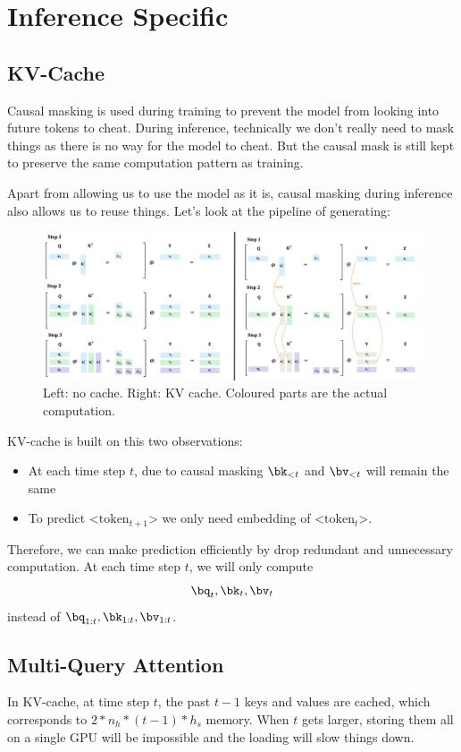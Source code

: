 \documentclass{article}
\begin{document}
\clearpage

\section{Inference Specific}
\subsection{KV-Cache}
Causal masking is used during training to prevent the model from looking into future tokens to cheat.
During inference, technically we don't really need to mask things as there is no way for the model to cheat.
But the causal mask is still kept to preserve the same computation pattern as training.


Apart from allowing us to use the model as it is, causal masking during inference also allows us to reuse things. 
Let's look at the pipeline of generating:

\begin{figure}[!h]
\centering
\includegraphics[scale=0.25]{imgs/kv-cache.png}
\caption{Left: no cache. Right: KV cache. Coloured parts are the actual computation.}
\end{figure}

KV-cache is built on this two observations:
\begin{itemize}
	\item At each time step $t$, due to causal masking $\bk_{<t}$ and $\bv_{<t}$ will remain the same
	\item To predict <$\text{token}_{t+1}$> we only need embedding of <$\text{token}_{t}$>.
\end{itemize}
Therefore, we can make prediction efficiently by drop redundant and unnecessary computation. At each time step $t$, we will only compute
\[
\bq_t, \bk_t, \bv_t
\]
instead of $\bq_{1:t}, \bk_{1:t}, \bv_{1:t}$.

\clearpage

\subsection{Multi-Query Attention}
In KV-cache, at time step $t$, the past $t-1$ keys and values are cached, which corresponds to $2 * n_h * (t-1) * h_s$ memory. 
When $t$ gets larger, storing them all on a single GPU will be impossible and the loading will slow things down.
\end{document}
